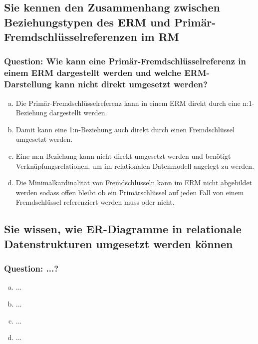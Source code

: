 \documentclass{article}
\begin{document}
\begin{adjustwidth}{2em}{2em}
\begin{adjustwidth}{2em}{2em}
			\subsection{Sie kennen den Zusammenhang zwischen Beziehungstypen des ERM und Primär-Fremdschlüsselreferenzen im RM}
			\begin{adjustwidth}{1em}{}
				\subsubsection*{Question: Wie kann eine Primär-Fremdschlüsselreferenz in einem ERM dargestellt werden und welche ERM-Darstellung kann nicht direkt umgesetzt werden?}
				\begin{adjustwidth}{1em}{}
					\begin{enumerate}[(a)]
						\item Die Primär-Fremdschlüsselreferenz kann in einem ERM direkt durch eine n:1-Beziehung dargestellt werden.
						\item Damit kann eine 1:n-Beziehung auch direkt durch einen Fremdschlüssel umgesetzt werden.
						\item Eine m:n Beziehung kann nicht direkt umgesetzt werden und benötigt Verknüpfungsrelationen, um im relationalen Datenmodell angelegt zu werden.
						\item Die Minimalkardinalität von Fremdschlüsseln kann im ERM nicht abgebildet werden sodass offen bleibt ob ein Primärschlüssel auf jeden Fall von einem Fremdschlüssel referenziert werden muss oder nicht.
					\end{enumerate}
				\end{adjustwidth}
			\end{adjustwidth}
			\subsection{Sie wissen, wie ER-Diagramme in relationale Datenstrukturen umgesetzt werden können}
			\begin{adjustwidth}{1em}{}
				\subsubsection*{Question: ...?}
				\begin{adjustwidth}{1em}{}
					\begin{enumerate}[(a)]
						\item ...
						\item ...
						\item ...
						\item ...
					\end{enumerate}
				\end{adjustwidth}
			\end{adjustwidth}
		\end{adjustwidth}
		

\end{adjustwidth}
\end{document}
